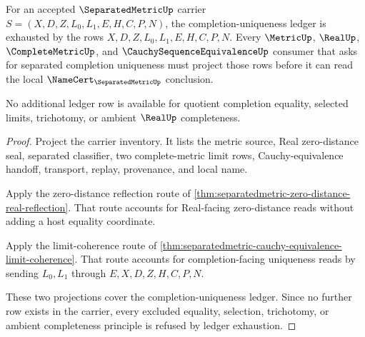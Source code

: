 \begin{theorem}
\label{thm:separatedmetric-namecert-ledger-exhaustion}
For an accepted $\SeparatedMetricUp$ carrier $S=(X,D,Z,L_0,L_1,E,H,C,P,N)$, the completion-uniqueness ledger is exhausted by the rows $X,D,Z,L_0,L_1,E,H,C,P,N$. Every $\MetricUp$, $\RealUp$, $\CompleteMetricUp$, and $\CauchySequenceEquivalenceUp$ consumer that asks for separated completion uniqueness must project those rows before it can read the local $\NameCert_{\SeparatedMetricUp}$ conclusion.

No additional ledger row is available for quotient completion equality, selected limits, trichotomy, or ambient $\RealUp$ completeness.
\end{theorem}
\begin{proof}
Project the carrier inventory. It lists the metric source, Real zero-distance seal, separated classifier, two complete-metric limit rows, Cauchy-equivalence handoff, transport, replay, provenance, and local name.

Apply the zero-distance reflection route of \autoref{thm:separatedmetric-zero-distance-real-reflection}. That route accounts for Real-facing zero-distance reads without adding a host equality coordinate.

Apply the limit-coherence route of \autoref{thm:separatedmetric-cauchy-equivalence-limit-coherence}. That route accounts for completion-facing uniqueness reads by sending $L_0,L_1$ through $E,X,D,Z,H,C,P,N$.

These two projections cover the completion-uniqueness ledger. Since no further row exists in the carrier, every excluded equality, selection, trichotomy, or ambient completeness principle is refused by ledger exhaustion.
\end{proof}

